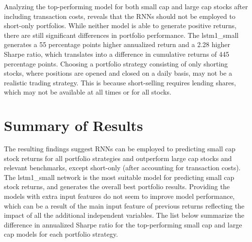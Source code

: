 \indent\newline 
Analyzing the top-performing model for both small cap and large cap stocks after including transaction costs, reveals that the RNNs should not be employed to short-only portfolios. While neither model is able to generate positive returns, there are still significant differences in portfolio performance. The lstm1\_small generates a 55 percentage points higher annualized return and a 2.28 higher Sharpe ratio, which translates into a difference in cumulative returns of 445 percentage points. Choosing a portfolio strategy consisting of only shorting stocks, where positions are opened and closed on a daily basis, may not be a realistic trading strategy. This is because short-selling requires lending shares, which may not be available at all times or for all stocks. 

\section{Summary of Results}
The resulting findings suggest RNNs can be employed to predicting small cap stock returns for all portfolio strategies and outperform large cap stocks and relevant benchmarks, except short-only (after accounting for transaction costs). The lstm1\_small network is the most suitable model for predicting small cap stock returns, and generates the overall best portfolio results. Providing the models with extra input features do not seem to improve model performance, which can be a result of the main input feature of previous returns reflecting the impact of all the additional independent variables. The list below summarize the difference in annualized Sharpe ratio for the top-performing small cap and large cap models for each portfolio strategy.

\indent\newline
\begin{table}[ht]
\centering
\caption{\textbf{Best Annualized Sharpe ratio prior to transaction costs - small vs large}}
\end{table}


